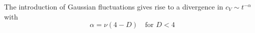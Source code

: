 \documentclass[../main/main.tex]{subfiles}
\begin{document}
\begin{figure}[h!]
\begin{minipage}[c]{0.5\linewidth}
\end{minipage}
\begin{minipage}[]{0.5\linewidth}
\centering
{}
\end{minipage}
\caption{\label{fig:} }
\end{figure}

The introduction of Gaussian fluctuations gives rise to a divergence in \( c_V \sim t^{- \alpha } \) with
\begin{equation}
  \alpha = \nu (4-D) \quad \text{for } D < 4
\end{equation}
\end{document}
